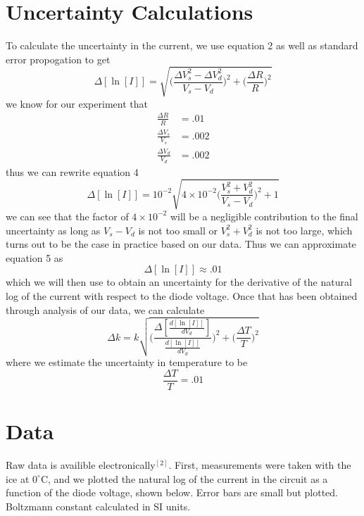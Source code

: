\documentclass[12pt, a4paper]{article}
\begin{document}
\section{Uncertainty Calculations}
	To calculate the uncertainty in the current, we use equation 2 as well as standard error propogation to get
	\begin{equation}
		\Delta [\ln [I]] = \sqrt{ \Big( \frac{\Delta V_s^2 - \Delta V_d^2}{V_s - V_d} \Big)^2 + \Big( \frac{\Delta R}{R} \Big)^2 }
		\label{eq. 4}
	\end{equation}
	\linebreak
	we know for our experiment that
	\begin{align*}
		\frac{\Delta R}{R} &= .01\\
		\frac{\Delta V_s}{V_s} &= .002\\
		\frac{\Delta V_d}{V_d} &= .002
	\end{align*}
	thus we can rewrite equation 4
	\begin{equation}
		\Delta [\ln [I]] = 10^{-2} \sqrt{ 4\times 10^{-2} \Big( \frac{V_s^2 + V_d^2}{V_s - V_d} \Big)^2 + 1 }
		\label{eq. 5}
	\end{equation}
	we can see that the factor of $4\times 10^{-2}$ will be a negligible contribution to the final uncertainty as long as $V_s - V_d$ is not too small or $V_s^2 + V_d^2$ is not too large, which turns out to be the case in practice based on our data. Thus we can approximate equation 5 as
	\begin{equation*}
		\Delta [\ln [I]] \approx .01
	\end{equation*}
	which we will then use to obtain an uncertainty for the derivative of the natural log of the current with respect to the diode voltage. Once that has been obtained through analysis of our data, we can calculate
	\begin{equation}
		\Delta k = k \sqrt{ \Big( \frac{\Delta [\frac{d[\ln[I]]}{dV_d}]}{\frac{d[\ln[I]]}{dV_d}} \Big)^2 + \Big( \frac{\Delta T}{T} \Big)^2 }
		\label{eq. 6}
	\end{equation}
	where we estimate the uncertainty in temperature to be
	\begin{equation*}
		\frac{\Delta T}{T} = .01
	\end{equation*}

\section{Data}
	Raw data is availible electronically$^{[2]}$. First, measurements were taken with the ice at $0^{\circ}$C, and we plotted the natural log of the current in the circuit as a function of the diode voltage, shown below. Error bars are small but plotted. Boltzmann constant calculated in SI units.
\end{document}
